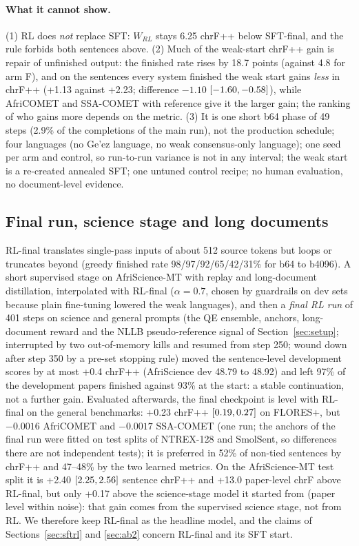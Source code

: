 \paragraph{What it cannot show.} (1) RL does \emph{not} replace SFT: $W_{RL}$ stays 6.25 chrF++ below SFT-final, and the rule forbids both sentences above. (2) Much of the weak-start chrF++ gain is repair of unfinished output: the finished rate rises by 18.7 points (against 4.8 for arm F), and on the sentences every system finished the weak start gains \emph{less} in chrF++ (+1.13 against +2.23; difference $-1.10$ $[-1.60, -0.58]$), while AfriCOMET and SSA-COMET with reference give it the larger gain; the ranking of who gains more depends on the metric. (3) It is one short b64 phase of 49 steps (2.9\% of the completions of the main run), not the production schedule; four languages (no Ge'ez language, no weak consensus-only language); one seed per arm and control, so run-to-run variance is not in any interval; the weak start is a re-created annealed SFT; one untuned control recipe; no human evaluation, no document-level evidence.

\subsection{Final run, science stage and long documents}\label{sec:final}
RL-final translates single-pass inputs of about 512 source tokens but loops or truncates beyond (greedy finished rate 98/97/92/65/42/31\% for b64 to b4096). A short supervised stage on AfriScience-MT \citep{abdulmumin2026afriscience} with replay and long-document distillation, interpolated with RL-final ($\alpha=0.7$, chosen by guardrails on dev sets because plain fine-tuning lowered the weak languages), and then a \emph{final RL run} of 401 steps on science and general prompts (the QE ensemble, anchors, long-document reward and the NLLB pseudo-reference signal of Section~\ref{sec:setup}; interrupted by two out-of-memory kills and resumed from step 250; wound down after step 350 by a pre-set stopping rule) moved the sentence-level development scores by at most +0.4 chrF++ (AfriScience dev 48.79 to 48.92) and left 97\% of the development papers finished against 93\% at the start: a stable continuation, not a further gain. Evaluated afterwards, the final checkpoint is level with RL-final on the general benchmarks: +0.23 chrF++ $[0.19, 0.27]$ on FLORES+, but $-0.0016$ AfriCOMET and $-0.0017$ SSA-COMET (one run; the anchors of the final run were fitted on test splits of NTREX-128 and SmolSent, so differences there are not independent tests); it is preferred in 52\% of non-tied sentences by chrF++ and 47--48\% by the two learned metrics. On the AfriScience-MT test split it is +2.40 $[2.25, 2.56]$ sentence chrF++ and +13.0 paper-level chrF above RL-final, but only +0.17 above the science-stage model it started from (paper level within noise): that gain comes from the supervised science stage, not from RL. We therefore keep RL-final as the headline model, and the claims of Sections~\ref{sec:sftrl} and \ref{sec:ab2} concern RL-final and its SFT start.
